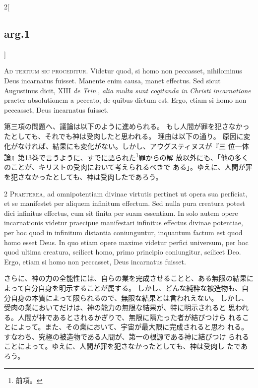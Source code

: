 \documentclass[paper=a4paper,fontsize=10pt,jafontsize=9pt,titlepage]{jlreq}
\begin{document}
\begin{paracol}{2}[\subsection{arg.1}]

{\Huge A}{\scshape d tertium sic proceditur}. Videtur quod,
si homo non peccasset, nihilominus Deus incarnatus fuisset. Manente enim
causa, manet effectus. Sed sicut Augustinus dicit, XIII {\itshape de Trin}., {\itshape alia
multa sunt cogitanda in Christi incarnatione} praeter absolutionem a
peccato, de quibus dictum est. Ergo, etiam si homo non peccasset, Deus
incarnatus fuisset.

\switchcolumn

第三項の問題へ、議論は以下のように進められる。
もし人間が罪を犯さなかったとしても、それでも神は受肉したと思われる。
理由は以下の通り。
原因に変化がなければ、結果にも変化がない。しかし、アウグスティヌスが『三
 位一体論』第13巻で言うように、すでに語られた\footnote{前項。}罪からの解
 放以外にも、「他の多くのことが、キリストの受肉において考えられるべきで
 ある」。ゆえに、人間が罪を犯さなかったとしても、神は受肉したであろう。


2 {\scshape Praeterea}, ad omnipotentiam divinae
virtutis pertinet ut opera sua perficiat, et se manifestet per aliquem
infinitum effectum. Sed nulla pura creatura potest dici infinitus
effectus, cum sit finita per suam essentiam. In solo autem opere
incarnationis videtur praecipue manifestari infinitus effectus divinae
potentiae, per hoc quod in infinitum distantia coniunguntur, inquantum
factum est quod homo esset Deus. In quo etiam opere maxime videtur
perfici universum, per hoc quod ultima creatura, scilicet homo, primo
principio coniungitur, scilicet Deo. Ergo, etiam si homo non peccasset,
Deus incarnatus fuisset.

\switchcolumn

さらに、神の力の全能性には、自らの業を完成させることと、ある無限の結果に
 よって自分自身を明示することが属する。
しかし、どんな純粋な被造物も、自分自身の本質によって限られるので、無限な結果とは言われえない。
しかし、受肉の業においてだけは、神の能力の無限な結果が、特に明示されると
 思われる。人間が神であるとされるかぎりで、無限に隔たった者が結びつけら
 れることによって。また、その業において、宇宙が最大限に完成されると思わ
 れる。すなわち、究極の被造物である人間が、第一の根源である神に結びつけ
 られることによって。ゆえに、人間が罪を犯さなかったとしても、神は受肉し
 たであろう。


\end{paracol}
\end{document}
